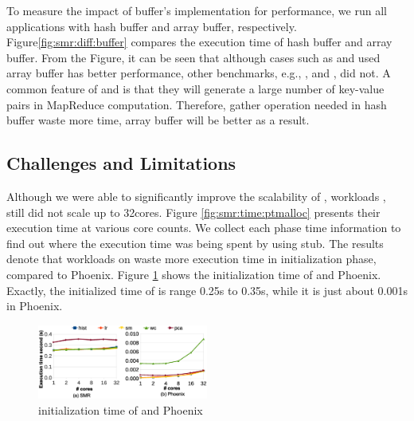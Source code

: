 To measure the impact of buffer's implementation for performance, we run all applications with hash buffer and array buffer, respectively.
Figure\ref{fig:smr:diff:buffer} compares the execution time of hash buffer and array buffer. 
From the Figure, it can be seen that although cases such as  and  used array buffer has better performance, other benchmarks, e.g., ,  and , did not.
A common feature of  and  is that they will generate a large number of key-value pairs in MapReduce computation.
Therefore, gather operation needed in hash buffer waste more time, array buffer will be better as a result.


\subsection{ Challenges and Limitations}	
Although we were able to significantly improve the scalability of \myds, 
workloads ,  still did not scale up to 32cores.
Figure \ref{fig:smr:time:ptmalloc} presents their execution time at various core counts.
We collect each phase time information to find out where the execution time was being spent by using stub. 
The results denote that workloads on \myds waste more execution time in initialization phase, compared to Phoenix.
Figure \ref{fig:env:init} shows the initialization time of \myds and Phoenix.
Exactly, the initialized time of \myds is range 0.25s to 0.35s, while it is just about 0.001s in Phoenix.
\begin{figure}[!h!t]  
	\centering
	\includegraphics[width=0.5\textwidth]{eps/env_init.eps}
	\caption{initialization time of \myds and Phoenix}
	\label{fig:env:init}
\end{figure}


